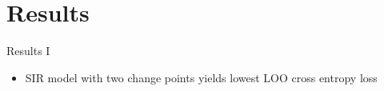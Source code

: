 \documentclass{beamer}
\begin{document}
\section{Results}
\begin{frame}{Results I}
	\begin{figure}
		
		\centering
	\end{figure}
	\begin{itemize}
		\item<2-> SIR model with two change points yields lowest LOO cross entropy loss
		
	\end{itemize}
		
\end{frame}
\begin{frame}
	\begin{figure}
		\centering
	\end{figure}
\end{frame}
\end{document}
